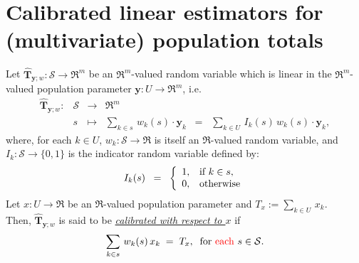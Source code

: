 \documentclass{article}
\begin{document}

\section{Calibrated linear estimators for (multivariate) population totals}
\setcounter{theorem}{0}

\begin{definition}
\mbox{}
\vskip 0.1cm
\noindent
Let $\widehat{\mathbf{T}}_{\mathbf{y};w} : \mathcal{S} \longrightarrow \Re^{m}$
be an $\Re^{m}$-valued random variable which is linear in the $\Re^{m}$-valued
population parameter $\mathbf{y} : U \longrightarrow \Re^{m}$, i.e.
\begin{equation*}
\begin{array}{cccl}
\widehat{\mathbf{T}}_{\mathbf{y};w} : & \mathcal{S} & \longrightarrow & \Re^{m} \\
     & s &\longmapsto & \underset{k\in s}{\sum}\,w_{k}(s)\cdot\mathbf{y}_{k} \;\; = \;\; \underset{k\in U}{\sum}\,I_{k}(s)\,w_{k}(s)\cdot\mathbf{y}_{k},
\end{array}
\end{equation*}
where, for each $k \in U$, $w_{k} : \mathcal{S} \longrightarrow \Re$ is itself an $\Re$-valued random variable,
and $I_{k} : \mathcal{S} \longrightarrow \{0,1\}$ is the indicator random variable defined by:
\begin{equation*}
I_{k}(s)
\;\;=\;\;
\left\{
\begin{array}{cl}
1, & \textnormal{if $k \in s$}, \\
0, & \textnormal{otherwise}
\end{array}
\right.
\end{equation*}
Let $x : U \longrightarrow \Re$ be an $\Re$-valued population parameter
and  $T_{x} := \underset{k\in U}{\sum}\,x_{k}$.\\
Then, $\widehat{\mathbf{T}}_{\mathbf{y};w}$ is said to be
\underline{\emph{calibrated with respect to $x$}} if
\begin{equation*}
\sum_{k \in s}\,w_{k}(s)\,x_{k} \; = \; T_{x},
\;\;\textnormal{for {\color{red}each} $s \in \mathcal{S}$}.
\end{equation*}
\end{definition}
\end{document}
